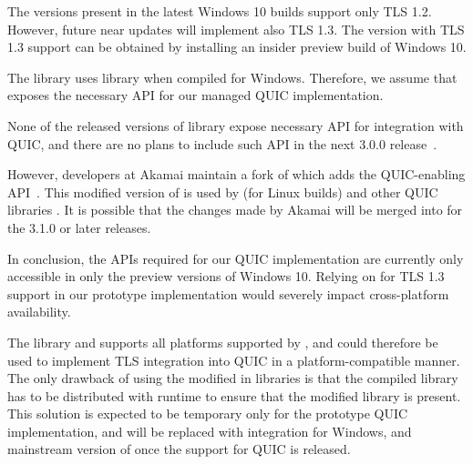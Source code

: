 \begin{description}

    The \libschannel{} versions present in the latest Windows 10 builds support only TLS 1.2. However,
    future near updates will implement also TLS 1.3. The \libschannel{} version with TLS 1.3 support can
    be obtained by installing an insider preview build of Windows 10.

    The \libmsquic{} library uses \libschannel{} library when compiled for Windows. Therefore, we assume
    that \libschannel{} exposes the necessary API for our managed QUIC implementation.

    \ditem{\libopenssl{}}
    None of the released versions of \libopenssl{} library expose necessary API for integration
    with QUIC, and there are no plans to include such API in the next \libopenssl{} 3.0.0
    release~\cite{OpensslBlogNoQuic}.

    However, developers at Akamai maintain a fork of \libopenssl{} which adds the QUIC-enabling
    API~\cite{AkamaiOpensslGithub}. This modified version of \libopenssl{} is used by \libmsquic{} (for Linux
    builds) and other QUIC libraries . It is possible that
    the changes made by Akamai will be merged into \libopenssl{} for the 3.1.0 or later releases.

\end{description}

In conclusion, the APIs required for our QUIC implementation are currently only accessible in only
the preview versions of Windows 10. Relying on \libschannel{} for TLS 1.3 support in our prototype
implementation would severely impact cross-platform availability.

The \libopenssl{} library and supports all platforms supported by \dotnet{}, and could therefore be
used to implement TLS integration into QUIC in a platform-compatible manner. The only drawback of
using the modified \libopenssl{} in \dotnet{} libraries is that the compiled library has to be
distributed with \dotnet{} runtime to ensure that the modified library is present. This solution is
expected to be temporary only for the prototype QUIC implementation, and will be replaced with
\libschannel{} integration for Windows, and mainstream version of \libopenssl{} once the support for
QUIC is released.


